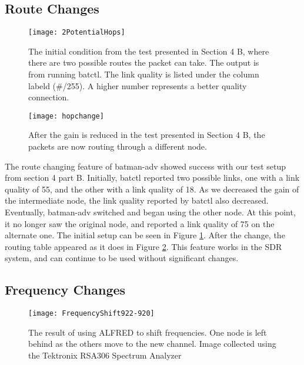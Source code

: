 \subsection{Route Changes}

\begin{figure}
	\centering
	\texttt{[image: 2PotentialHops]}
	\caption{The initial condition from the test presented in Section 4 B, where there are two possible routes the packet can take. The output is from running batctl. The link quality is listed under the column labeld (\#/255). A higher number represents a better quality connection.}
	\label{fig:2Hops}
\end{figure}

\begin{figure}
	\centering
	\texttt{[image: hopchange]}
	\caption{After the gain is reduced in the test presented in Section 4 B, the packets are now routing through a different node.}
	\label{fig:NewHop}
\end{figure}

The route changing feature of batman-adv showed success with our test setup from section 4 part B. Initially, batctl reported two possible links, one with a link quality of 55, and the other with a link quality of 18. As we decreased the gain of the intermediate node, the link quality reported by batctl also decreased. Eventually, batman-adv switched and began using the other node. At this point, it no longer saw the original node, and reported a link quality of 75 on the alternate one. The initial setup can be seen in Figure \ref{fig:2Hops}. After the change, the routing table appeared as it does in Figure \ref{fig:NewHop}. This feature works in the SDR system, and can continue to be used without significant changes.  

\subsection{Frequency Changes}

\begin{figure}
	\centering
	\texttt{[image: FrequencyShift922-920]}
	\caption{The result of using ALFRED to shift frequencies. One node is left behind as the others move to the new channel. Image collected using the Tektronix RSA306 Spectrum Analyzer}
	\label{fig:freqshift}
\end{figure}


